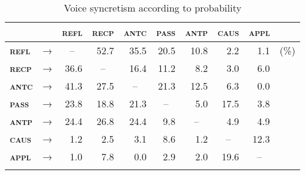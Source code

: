 \begin{table}[b]
	\setlength{\tabcolsep}{3pt}
	\begin{tabularx}{.79\textwidth}{llrrrrrrrl}
		\lsptoprule
		& & \multicolumn{1}{c}{\textbf{\textsc{refl}}} & \multicolumn{1}{c}{\textbf{\textsc{recp}}} & \multicolumn{1}{c}{\textbf{\textsc{antc}}} & \multicolumn{1}{c}{\textbf{\textsc{pass}}} & \multicolumn{1}{c}{\textbf{\textsc{antp}}} & \multicolumn{1}{c}{\textbf{\textsc{caus}}} &  \multicolumn{1}{c}{\textbf{\textsc{appl}}} & \\
		\midrule
		\textbf{\textsc{refl}} & → & \multicolumn{1}{c}{--} & 52.7 & 35.5 & 20.5 & 10.8 & 2.2 & 1.1 & (\%) \\
		\textbf{\textsc{recp}} & → & 36.6 & \multicolumn{1}{c}{--} & 16.4 & 11.2 & 8.2 & 3.0 & 6.0 & \\
		\textbf{\textsc{antc}} & → & 41.3 & 27.5 & \multicolumn{1}{c}{--} & 21.3 & 12.5 & 6.3 & 0.0 & \\
		\textbf{\textsc{pass}} & → & 23.8 & 18.8 & 21.3 & \multicolumn{1}{c}{--} & 5.0 & 17.5 & 3.8 & \\
		\textbf{\textsc{antp}} & → & 24.4 & 26.8 & 24.4 & 9.8 & \multicolumn{1}{c}{--} & 4.9 & 4.9 & \\
		\textbf{\textsc{caus}} & → & 1.2 & 2.5 & 3.1 & 8.6 & 1.2 & \multicolumn{1}{c}{--} & 12.3 & \\
		\textbf{\textsc{appl}} & → & 1.0 & 7.8 & 0.0 & 2.9 & 2.0 & 19.6 & \multicolumn{1}{c}{--} & \\
		\lspbottomrule
	\end{tabularx}
	\caption{Voice syncretism according to probability}
	\label{tab:ch6:voice-syncretism-probability}
\end{table}

